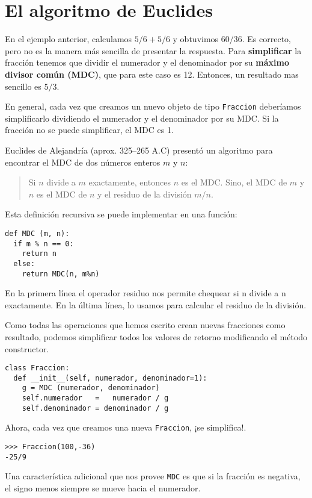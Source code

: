 \section{El algoritmo de Euclides}

  

En el ejemplo anterior, calculamos $5/6+5/6$ y obtuvimos $60/36$.
Es correcto, pero no es la manera más sencilla de presentar la respuesta.
Para \textbf{simplificar} la fracción tenemos que dividir el numerador
y el denominador por su \textbf{máximo divisor común (MDC)}, que para
este caso es 12. Entonces, un resultado mas sencillo es $5/3$.

En general, cada vez que creamos un nuevo objeto de tipo \texttt{Fraccion}
deberíamos simplificarlo dividiendo el numerador y el denominador
por su MDC. Si la fracción no se puede simplificar, el MDC es 1.

Euclides de Alejandría (aprox. 325–265 A.C) presentó un algoritmo
para encontrar el MDC de dos números enteros $m$ y $n$:
\begin{quote}
Si $n$ divide a $m$ exactamente, entonces $n$ es el MDC. Sino,
el MDC de $m$ y $n$ es el MDC de $n$ y el residuo de la división
$m/n$. 
\end{quote}
Esta definición recursiva se puede implementar en una función:

\begin{lstlisting}
def MDC (m, n):
  if m % n == 0:
    return n
  else:
    return MDC(n, m%n)
\end{lstlisting}
 En la primera línea el operador residuo nos permite chequear si n
divide a n exactamente. En la última línea, lo usamos para calcular
el residuo de la división.

Como todas las operaciones que hemos escrito crean nuevas fracciones
como resultado, podemos simplificar todos los valores de retorno modificando
el método constructor.

\begin{lstlisting}
class Fraccion:
  def __init__(self, numerador, denominador=1):
    g = MDC (numerador, denominador)
    self.numerador   =   numerador / g
    self.denominador = denominador / g
\end{lstlisting}
 Ahora, cada vez que creamos una nueva \texttt{Fraccion}, ¡se simplifica!.

\begin{lstlisting}
>>> Fraccion(100,-36)
-25/9
\end{lstlisting}
 Una característica adicional que nos provee \texttt{MDC} es que si
la fracción es negativa, el signo menos siempre se mueve hacia el
numerador.

